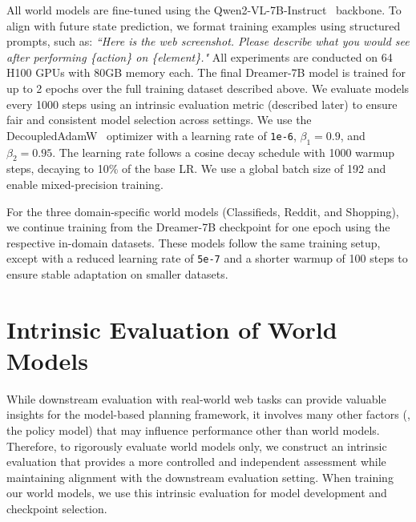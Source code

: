 All world models are fine-tuned using the Qwen2-VL-7B-Instruct~\citep{Wang2024Qwen2VL} backbone.
To align with future state prediction, we format training examples using structured prompts, such as:
\textit{``Here is the web screenshot. Please describe what you would see after performing \{action\} on \{element\}."}
All experiments are conducted on 64 H100 GPUs with 80GB memory each.
The final Dreamer-7B model is trained for up to 2 epochs over the full training dataset described above.
We evaluate models every 1000 steps using an intrinsic evaluation metric (described later) to ensure fair and consistent model selection across settings.
We use the DecoupledAdamW~\citep{loshchilov2018decoupled} optimizer with a learning rate of \texttt{1e-6}, $\beta_1 = 0.9$, and $\beta_2 = 0.95$.
The learning rate follows a cosine decay schedule with 1000 warmup steps, decaying to 10\% of the base LR.
We use a global batch size of 192 and enable mixed-precision training.

For the three domain-specific world models (Classifieds, Reddit, and Shopping), we continue training from the Dreamer-7B checkpoint for one epoch using the respective in-domain datasets.
These models follow the same training setup, except with a reduced learning rate of \texttt{5e-7} and a shorter warmup of 100 steps to ensure stable adaptation on smaller datasets.





\section{Intrinsic Evaluation of World Models}

\label{appendix:intrinsic-eval}

While downstream evaluation with real-world web tasks can provide valuable insights for the model-based planning framework, it involves many other factors (\eg, the policy model) that may influence performance other than world models.
Therefore, to rigorously evaluate world models only, we construct an intrinsic evaluation that provides a more controlled and independent assessment while maintaining alignment with the downstream evaluation setting.
When training our world models, we use this intrinsic evaluation for model development and checkpoint selection.

